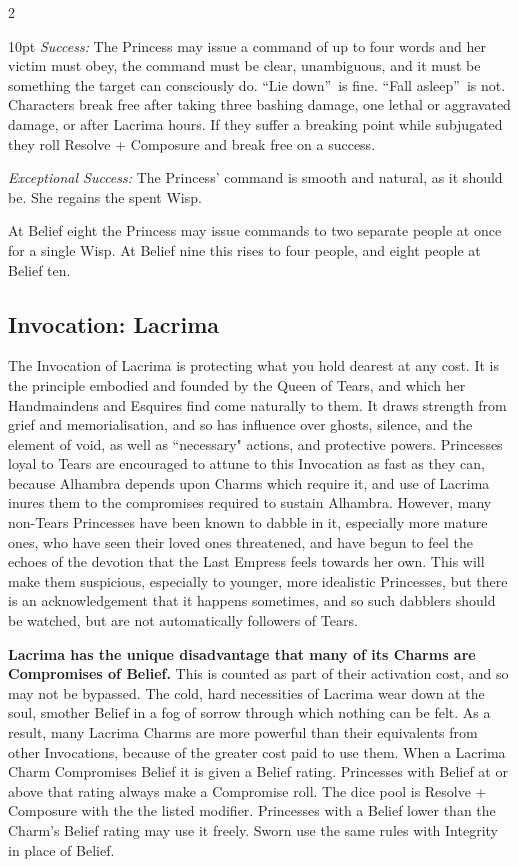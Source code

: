 \begin{multicols}{2}
\begin{myindentpar}{10pt}
    \emph{Success:}  The Princess may issue a command of up to four words and her victim must obey, the command must be clear, unambiguous, and it must be something the target can consciously do. \textquotedblleft Lie down\textquotedblright\, is fine. \textquotedblleft Fall asleep\textquotedblright\, is not. Characters break free after taking three bashing damage, one lethal or aggravated damage, or after Lacrima hours. If they suffer a breaking point while subjugated they roll Resolve + Composure and break free on a success. 
	
    \emph{Exceptional Success:} The Princess' command is smooth and natural, as it should be. She regains the spent Wisp.\end{myindentpar}

\noindent At Belief eight the Princess may issue commands to two separate people at once for a single Wisp. At Belief nine this rises to four people, and eight people at Belief ten.

\subsection*{Invocation: Lacrima}

\label{LacrimaRef}
The Invocation of Lacrima is protecting what you hold dearest at any cost. It is the principle embodied and founded by the Queen of Tears, and which her Handmaindens and Esquires find come naturally to them. It draws strength from grief and memorialisation, and so has influence over ghosts, silence, and the element of void, as well as \textquotedblleft necessary" actions, and protective powers. Princesses loyal to Tears are encouraged to attune to this Invocation as fast as they can, because Alhambra depends upon Charms which require it, and use of Lacrima inures them to the compromises required to sustain Alhambra. However, many non-Tears Princesses have been known to dabble in it, especially more mature ones, who have seen their loved ones threatened, and have begun to feel the echoes of the devotion that the Last Empress feels towards her own. This will make them suspicious, especially to younger, more idealistic Princesses, but there is an acknowledgement that it happens sometimes, and so such dabblers should be watched, but are not 
automatically followers of 
Tears.

\textbf{Lacrima has the unique disadvantage that many of its Charms are Compromises of Belief.} This is counted as part of their activation cost, and so may not be bypassed. The cold, hard necessities of Lacrima wear down at the soul, smother Belief in a fog of sorrow through which nothing can be felt. As a result, many Lacrima Charms are more powerful than their equivalents from other Invocations, because of the greater cost paid to use them. When a Lacrima Charm Compromises Belief it is given a Belief rating. Princesses with Belief at or above that rating always make a Compromise roll. The dice pool is Resolve + Composure with the the listed modifier. Princesses with a Belief lower than the Charm's Belief rating may use it freely. Sworn use the same rules with Integrity in place of Belief.


\end{multicols}
